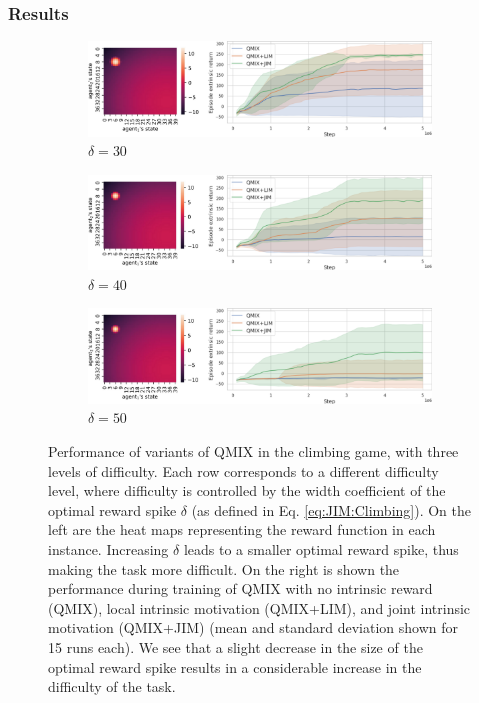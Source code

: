 \subsubsection{Results}

\begin{figure}
     \centering
     \begin{subfigure}[c]{\textwidth}
        \centering
        \includegraphics[width=\textwidth]{Figures/JIM/roR30.png}
        \caption{$\delta=30$}
        \label{fig:JIM:ro30}
     \end{subfigure}
     \vspace{1em}
     \begin{subfigure}[c]{\textwidth}
        \centering
        \includegraphics[width=\textwidth]{Figures/JIM/roR40.png}
        \caption{$\delta=40$}
        \label{fig:JIM:ro40}
     \end{subfigure}
     \vspace{1em}
     \begin{subfigure}[c]{\textwidth}
        \centering
        \includegraphics[width=\textwidth]{Figures/JIM/roR50.png}
        \caption{$\delta=50$}
        \label{fig:JIM:ro50}
     \end{subfigure}
     \caption{Performance of variants of QMIX in the climbing game, with three levels of difficulty. Each row corresponds to a different difficulty level, where difficulty is controlled by the width coefficient of the optimal reward spike $\delta$ (as defined in Eq. \eqref{eq:JIM:Climbing}). On the left are the heat maps representing the reward function in each instance. Increasing $\delta$ leads to a smaller optimal reward spike, thus making the task more difficult. On the right is shown the performance during training of QMIX with no intrinsic reward (QMIX), local intrinsic motivation (QMIX+LIM), and joint intrinsic motivation (QMIX+JIM) (mean and standard deviation shown for 15 runs each). We see that a slight decrease in the size of the optimal reward spike results in a considerable increase in the difficulty of the task.}

\end{figure}
